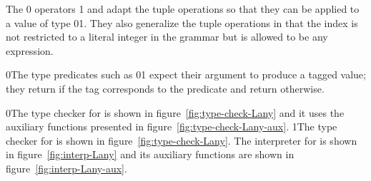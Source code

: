 \documentclass[7x10]{TimesAPriori_MIT}%
\def\racketEd{0}
\def\pythonEd{1}
\def\edition{1}
\newcommand{\racket}[1]{{\if\edition\racketEd{#1}\fi}}
\newcommand{\pythonColor}[0]{}
\newcommand{\python}[1]{{\if\edition\pythonEd\pythonColor #1\fi}}
\numberwithin{theorem}{chapter}
\numberwithin{definition}{chapter}
\numberwithin{equation}{chapter}
\begin{document}
The \racket{} operators
\python{ and } adapt the tuple
operations so that they can be applied to a value of type
\racket{}\python{}.  They also generalize the
tuple operations in that the index is not restricted to a literal
integer in the grammar but is allowed to be any expression.

\racket{The type predicates such as
\racket{}\python{\key{is\_bool}} expect their argument
to produce a tagged value; they return  {\TRUE} if the tag corresponds to
the predicate and return {\FALSE} otherwise.}

\racket{The type checker for \LangAny{} is shown in figure~\ref{fig:type-check-Lany}
and it uses the auxiliary functions presented in figure~\ref{fig:type-check-Lany-aux}.}
\python{The type checker for \LangAny{} is shown in figure~\ref{fig:type-check-Lany}.}
The interpreter for \LangAny{} is shown in figure~\ref{fig:interp-Lany} and
its auxiliary functions are shown in figure~\ref{fig:interp-Lany-aux}.
\end{document}
